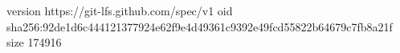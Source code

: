 version https://git-lfs.github.com/spec/v1
oid sha256:92de1d6c444121377924e62f9e4d49361c9392e49fcd55822b64679c7fb8a21f
size 174916
